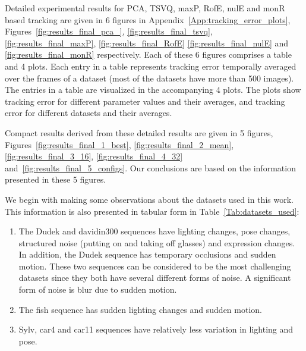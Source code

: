 \begin{Body}
Detailed experimental results for PCA, TSVQ, maxP, RofE, nulE and monR based tracking are given in 6 figures in Appendix~\ref{App:tracking_error_plots}, Figures~\ref{fig:results_final_pca_}, \ref{fig:results_final_tsvq}, \ref{fig:results_final_maxP}, \ref{fig:results_final_RofE} \ref{fig:results_final_nulE} and \ref{fig:results_final_monR} respectively.  Each of these 6 figures comprises a table and 4 plots.  Each entry in a table represents tracking error temporally averaged over the frames of a dataset (most of the datasets have more than 500 images).  The entries in a table are visualized in the accompanying 4 plots.  The plots show tracking error for different parameter values and their averages, and tracking error for different datasets and their averages.  

Compact results derived from these detailed results are given in 5 figures, Figures~\ref{fig:results_final_1_best}, \ref{fig:results_final_2_mean}, \ref{fig:results_final_3_16}, \ref{fig:results_final_4_32} and~\ref{fig:results_final_5_configs}.  Our conclusions are based on the information presented in these 5 figures. 

We begin with making some observations about the datasets used in this work.  This information is also presented in tabular form in Table~\ref{Tab:datasets_used}:

\begin{enumerate}
\item The Dudek and davidin300 sequences have lighting changes, pose changes, structured noise (putting on and taking off glasses) and expression changes.  In addition, the Dudek sequence has temporary occlusions and sudden motion.  These two sequences can be considered to be the most challenging datasets since they both have several different forms of noise.  A significant form of noise is blur due to sudden motion.  
\item The fish sequence has sudden lighting changes and sudden motion.
\item Sylv, car4 and car11 sequences have relatively less variation in lighting and pose.
\end{enumerate}



\end{Body}
